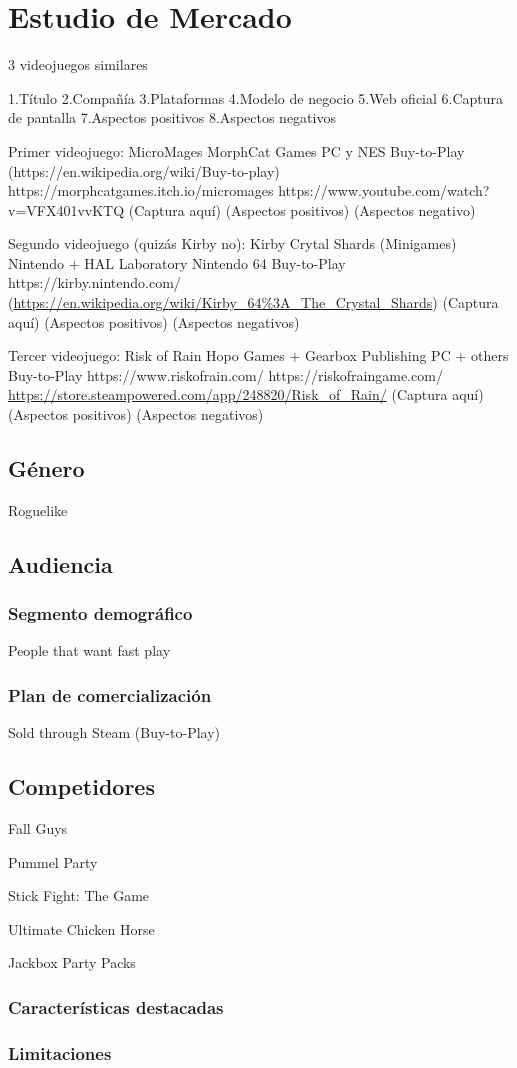 \chapter{Estudio de Mercado}

3 videojuegos similares

    1.Título
    2.Compañía
    3.Plataformas
    4.Modelo de negocio
    5.Web oficial
    6.Captura de pantalla
    7.Aspectos positivos
    8.Aspectos negativos

Primer videojuego:
    MicroMages
    MorphCat Games
    PC y NES
    Buy-to-Play (https://en.wikipedia.org/wiki/Buy-to-play)
    https://morphcatgames.itch.io/micromages
    https://www.youtube.com/watch?v=VFX401vvKTQ
    (Captura aquí)
    (Aspectos positivos)
    (Aspectos negativo)

Segundo videojuego (quizás Kirby no):
    Kirby Crytal Shards (Minigames)
    Nintendo + HAL Laboratory
    Nintendo 64
    Buy-to-Play
    https://kirby.nintendo.com/ (\url{https://en.wikipedia.org/wiki/Kirby_64\%3A_The_Crystal_Shards})
    (Captura aquí)
    (Aspectos positivos)
    (Aspectos negativos)
    
Tercer videojuego:
    Risk of Rain
    Hopo Games + Gearbox Publishing
    PC + others
    Buy-to-Play
    https://www.riskofrain.com/
    https://riskofraingame.com/
    \url{https://store.steampowered.com/app/248820/Risk_of_Rain/}
    (Captura aquí)
    (Aspectos positivos)
    (Aspectos negativos)

\section{Género}

Roguelike

\section{Audiencia}

\subsection{Segmento demográfico}
People that want fast play

\subsection{Plan de comercialización}
Sold through Steam (Buy-to-Play)

\section{Competidores}

Fall Guys

Pummel Party

Stick Fight: The Game

Ultimate Chicken Horse

Jackbox Party Packs

\subsection{Características destacadas}

\subsection{Limitaciones}
